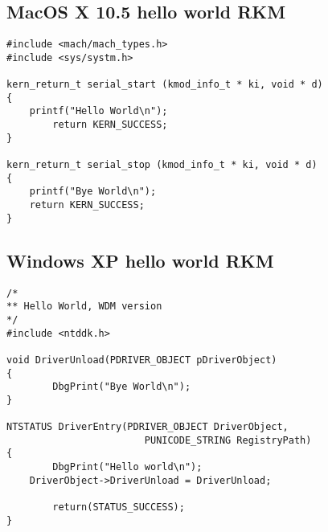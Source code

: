 \documentclass[11pt]{report}
\begin{document}
\newpage
  \subsection{MacOS X 10.5 hello world RKM}
    \begin{lstlisting}
#include <mach/mach_types.h>
#include <sys/systm.h>

kern_return_t serial_start (kmod_info_t * ki, void * d) 
{
	printf("Hello World\n");
    	return KERN_SUCCESS;
}

kern_return_t serial_stop (kmod_info_t * ki, void * d) 
{
	printf("Bye World\n");
	return KERN_SUCCESS;
}
    \end{lstlisting}

\newpage
  \subsection{Windows XP hello world RKM}
    \begin{lstlisting}
/*
** Hello World, WDM version
*/
#include <ntddk.h>

void DriverUnload(PDRIVER_OBJECT pDriverObject)
{
        DbgPrint("Bye World\n");
}

NTSTATUS DriverEntry(PDRIVER_OBJECT DriverObject,
                        PUNICODE_STRING RegistryPath)
{
        DbgPrint("Hello world\n");
	DriverObject->DriverUnload = DriverUnload;

        return(STATUS_SUCCESS);
}
    \end{lstlisting}
\end{document}
